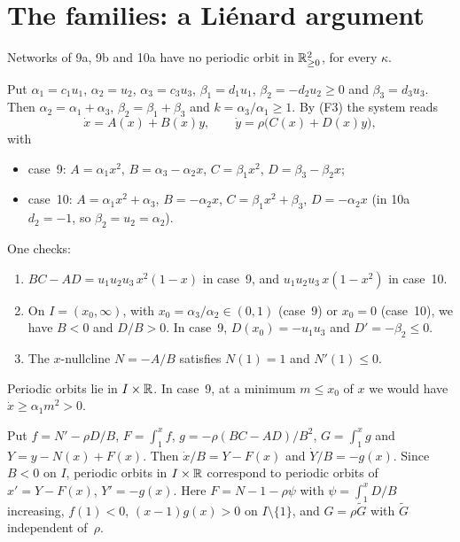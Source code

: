 \documentclass[11pt,a4paper]{report}
\newcommand{\Gt}{\widetilde G}
\begin{document}
\section{The families: a Li\'enard argument}

\begin{theorem}\label{thm:families}
Networks of 9a, 9b and 10a have no periodic orbit in \(\mathbb{R}^2_{\ge0}\), for every \(\kappa\).
\end{theorem}

Put \(\alpha_1=c_1u_1\), \(\alpha_2=u_2\), \(\alpha_3=c_3u_3\), \(\beta_1=d_1u_1\), \(\beta_2=-d_2u_2\ge0\) and
\(\beta_3=d_3u_3\). Then \(\alpha_2=\alpha_1+\alpha_3\), \(\beta_2=\beta_1+\beta_3\) and \(k=\alpha_3/\alpha_1\ge1\).
By (F3) the system reads
\[
\dot x=A(x)+B(x)y,\qquad \dot y=\rho\bigl(C(x)+D(x)y\bigr),
\]
with
\begin{itemize}
\item case~9: \(A=\alpha_1x^2\), \(B=\alpha_3-\alpha_2x\), \(C=\beta_1x^2\), \(D=\beta_3-\beta_2x\);
\item case~10: \(A=\alpha_1x^2+\alpha_3\), \(B=-\alpha_2x\), \(C=\beta_1x^2+\beta_3\), \(D=-\alpha_2x\) (in 10a
  \(d_2=-1\), so \(\beta_2=u_2=\alpha_2\)).
\end{itemize}

One checks:
\begin{enumerate}
\item \(BC-AD=u_1u_2u_3\,x^2(1-x)\) in case~9, and \(u_1u_2u_3\,x(1-x^2)\) in case~10.
\item On \(I=(x_0,\infty)\), with \(x_0=\alpha_3/\alpha_2\in(0,1)\) (case~9) or \(x_0=0\) (case~10), we have \(B<0\)
  and \(D/B>0\). In case~9, \(D(x_0)=-u_1u_3\) and \(D'=-\beta_2\le0\).
\item The \(x\)-nullcline \(N=-A/B\) satisfies \(N(1)=1\) and \(N'(1)\le0\).
\end{enumerate}
Periodic orbits lie in \(I\times\mathbb{R}\). In case~9, at a minimum \(m\le x_0\) of \(x\) we would have
\(\dot x\ge\alpha_1m^2>0\).

\begin{lemma}\label{lem:lienard}
Put \(f=N'-\rho D/B\), \(F=\int_1^xf\), \(g=-\rho(BC-AD)/B^2\), \(G=\int_1^xg\) and \(Y=y-N(x)+F(x)\). Then
\(\dot x/B=Y-F(x)\) and \(\dot Y/B=-g(x)\). Since \(B<0\) on \(I\), periodic orbits in \(I\times\mathbb{R}\) correspond to
periodic orbits of \(x'=Y-F(x)\), \(Y'=-g(x)\). Here \(F=N-1-\rho\psi\) with \(\psi=\int_1^xD/B\) increasing,
\(f(1)<0\), \((x-1)g(x)>0\) on \(I\setminus\{1\}\), and \(G=\rho\Gt\) with \(\Gt\) independent of~\(\rho\).
\end{lemma}
\end{document}
